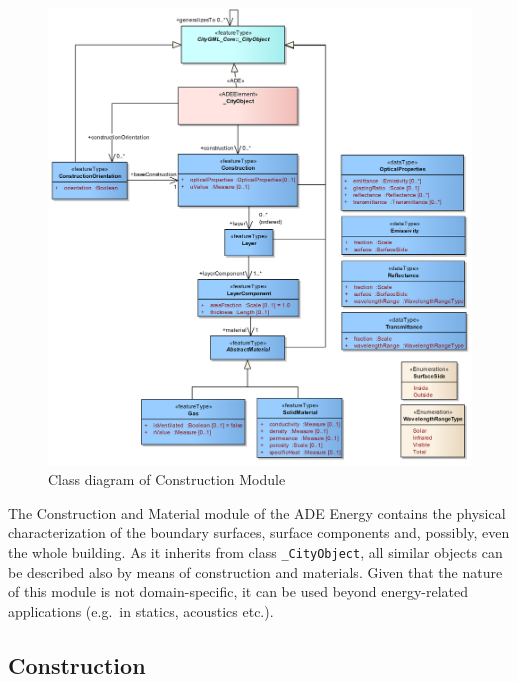 \documentclass[a4paper,12pt]{article}
\begin{document}
\begin{figure}[htbp]
\centering
\includegraphics{fig/class_construction.png}
\caption{Class diagram of Construction Module}
\end{figure}

The Construction and Material module of the ADE Energy contains the
physical characterization of the boundary surfaces, surface components
and, possibly, even the whole building. As it inherits from class
\texttt{\_CityObject}, all similar objects can be described also by
means of construction and materials. Given that the nature of this
module is not domain-specific, it can be used beyond energy-related
applications (e.g.~in statics, acoustics etc.).

\subsection{Construction}\label{construction}
\end{document}
